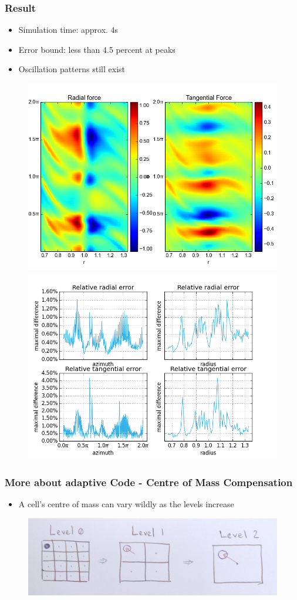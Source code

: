 \documentclass{beamer}
\begin{document}
\begin{frame}
 \frametitle{Result}
\begin{itemize}
  \item Simulation time: approx. 4s
  \item Error bound: less than 4.5 percent at peaks
  \item Oscillation patterns still exist
 \end{itemize}

 \begin{figure}[H]
  \centering
  \includegraphics[width=.5\textwidth]{../../../Sara/run/default/forcesA-euclid.png}     \includegraphics[width=.5\textwidth]{../../../Sara/run/default/diff_1D.png}
\end{figure}
\end{frame}
\begin{frame}
 \frametitle{More about adaptive Code - Centre of Mass Compensation}
\begin{itemize}
  \item A cell's centre of mass can vary wildly as the levels increase
 \end{itemize}
 \begin{figure}[H]
  \centering
  \includegraphics[width=.7\textwidth]{../../../Sara/plots/COM_correction.png}     
\end{figure}
\end{frame}
\end{document}
